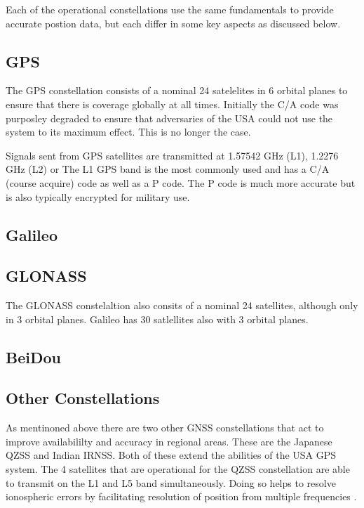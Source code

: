 Each of the operational constellations use the same fundamentals to provide accurate postion data, but each differ in some key aspects as discussed below.

\subsection{GPS}
The GPS constellation consists of a nominal 24 satelelites in 6 orbital planes to ensure that there is coverage globally at all times. Initially the C/A code was
purposley degraded to ensure that adversaries of the USA could not use the system to its maximum effect. This is no longer the case. 

Signals sent from GPS satellites
are transmitted at 1.57542 GHz (L1), 1.2276 GHz (L2) or  
The L1 GPS band is the most commonly used and has a C/A (course acquire) code as well as a P code. The P code is much more accurate but is also typically encrypted for
military use.

\subsection{Galileo}

\subsection{GLONASS}
The GLONASS constelaltion also consits of a nominal 24 satellites, although only in 3 orbital planes. Galileo has 30 satlellites also with 3 orbital planes.

\subsection{BeiDou}

\subsection{Other Constellations}
As mentinoned above there are two other GNSS constellations that act to improve availabililty and accuracy in regional areas. These are the Japanese QZSS and Indian
IRNSS. Both of these extend the abilities of the USA GPS system. The 4 satellites that are operational for the QZSS constellation are able to transmit on the L1 and L5
band  simultaneously. Doing so helps to resolve ionospheric errors by facilitating resolution of position from multiple frequencies \cite{RN48}.

